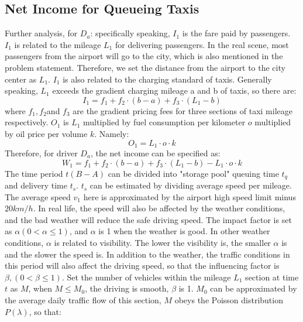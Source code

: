 \subsection{Net Income for Queueing Taxis}
Further analysis, for $D_{a}$: specifically speaking, $I_{1}$ is the fare paid by passengers. $I_1$ is related to the mileage $L_1$ for delivering passengers. In the real scene, most passengers from the airport will go to the city, which is also mentioned in the problem statement. Therefore, we set the distance from the airport to the city center as $L_1$. $I_1$ is also related to the charging standard of taxis. Generally speaking, $L_1$ exceeds the gradient charging mileage a and b of taxis, so there are:
\begin{equation}
	I_{1} = f_{1}+f_{2} \cdot (b-a)+f_{3} \cdot (L_{1}-b)
	\label{I_1}
\end{equation}
where $f_{1}, f_{2}$and $f_{3}$ are the gradient pricing fees for three sections of taxi mileage respectively. $O_{1}$ is $L_{1}$ multiplied by fuel consumption per kilometer $o$ multiplied by oil price per volume $k$. Namely:
\begin{equation}
	O_{1}= L_{1}\cdot o \cdot k 
	\label{O_1}
\end{equation}
Therefore, for driver $D_{a}$, the net income can be specified as:
\begin{equation}
	W_{1}= f_{1}+f_{2} \cdot (b-a)+f_{3} \cdot (L_{1}-b) - L_{1}\cdot o \cdot k 
	\label{W_1_1}
\end{equation}
The time period $t(B-A)$ can be divided into "storage pool" queuing time $t_{q}$ and delivery time $t_{s}$. $t_{s}$ can be estimated by dividing average speed per mileage. The average speed $v_{1}$ here is approximated by the airport high speed limit minus $20km/h$. In real life, the speed will also be affected by the weather conditions, and the bad weather will reduce the safe driving speed. The impact factor is set as $\alpha (0 < \alpha \leq 1)$, and $\alpha$ is 1 when the weather is good. In other weather conditions, $\alpha$ is related to visibility. The lower the visibility is, the smaller $\alpha$ is and the slower the speed is. In addition to the weather, the traffic conditions in this period will also affect the driving speed, so that the influencing factor is $\beta, (0 < \beta \leq 1)$. Set the number of vehicles within the mileage $L_{1}$ section at time $t$ as $M$, when $M \leq M_{0}$, the driving is smooth, $\beta$ is 1. $M_{0}$ can be approximated by the average daily traffic flow of this section, $M$ obeys the Poisson distribution $P(\lambda)$, so that:
